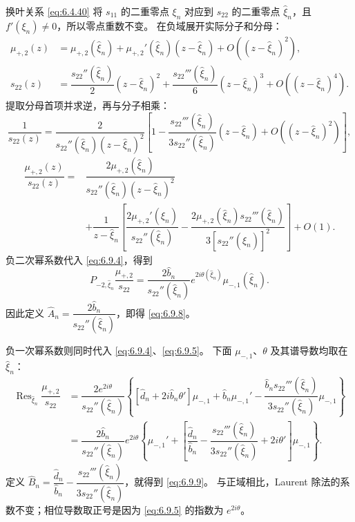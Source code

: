 \documentclass[lang=cn,scheme=chinese,mode=simple,device=normal,color=blue,
math=cm,thmcnt=section,12pt]{elegantbook}
\DeclareMathOperator*{\Res}{Res}
\begin{document}
\begin{callout}
    换叶关系 \eqref{eq:6.4.40} 将 $s_{11}$ 的二重零点 $\xi_n$ 对应到
    $s_{22}$ 的二重零点 $\widehat\xi_n$，且 $f'(\xi_n)\ne0$，所以零点重数不变。
    在负域展开实际分子和分母：
    \[
        \begin{aligned}
            \mu_{+,2}(z) & =\mu_{+,2}(\widehat\xi_n)+\mu_{+,2}'(\widehat\xi_n)(z-\widehat\xi_n)
            +O((z-\widehat\xi_n)^2),                                                            \\
            s_{22}(z)    & =\dfrac{s_{22}''(\widehat\xi_n)}{2}(z-\widehat\xi_n)^2
            +\dfrac{s_{22}'''(\widehat\xi_n)}{6}(z-\widehat\xi_n)^3+O((z-\widehat\xi_n)^4).
        \end{aligned}
    \]
    提取分母首项并求逆，再与分子相乘：
    \[
        \dfrac{1}{s_{22}(z)}=\dfrac{2}{s_{22}''(\widehat\xi_n)(z-\widehat\xi_n)^2}
        \left[1-\dfrac{s_{22}'''(\widehat\xi_n)}{3s_{22}''(\widehat\xi_n)}(z-\widehat\xi_n)
            +O((z-\widehat\xi_n)^2)\right],
    \]
    \[
        \begin{aligned}
            \dfrac{\mu_{+,2}(z)}{s_{22}(z)}
            ={} & \dfrac{2\mu_{+,2}(\widehat\xi_n)}{s_{22}''(\widehat\xi_n)(z-\widehat\xi_n)^2} \\
                & +\dfrac{1}{z-\widehat\xi_n}\left[
                \dfrac{2\mu_{+,2}'(\widehat\xi_n)}{s_{22}''(\widehat\xi_n)}
                -\dfrac{2\mu_{+,2}(\widehat\xi_n)s_{22}'''(\widehat\xi_n)}{3[s_{22}''(\widehat\xi_n)]^2}\right]+O(1).
        \end{aligned}
    \]
    负二次幂系数代入 \eqref{eq:6.9.4}，得到
    \[
        P_{-2,\widehat\xi_n}\dfrac{\mu_{+,2}}{s_{22}}
        =\dfrac{2\widehat b_n}{s_{22}''(\widehat\xi_n)}e^{2i\theta(\widehat\xi_n)}\mu_{-,1}(\widehat\xi_n).
    \]
    因此定义 $\widehat A_n=\dfrac{2\widehat b_n}{s_{22}''(\widehat\xi_n)}$，即得 \eqref{eq:6.9.8}。

    负一次幂系数则同时代入 \eqref{eq:6.9.4}、\eqref{eq:6.9.5}。
    下面 $\mu_{-,1}$、$\theta$ 及其谱导数均取在 $\widehat\xi_n$：
    \[
        \begin{aligned}
            \Res_{\widehat\xi_n}\dfrac{\mu_{+,2}}{s_{22}}
             & =\dfrac{2e^{2i\theta}}{s_{22}''(\widehat\xi_n)}
            \left\{[\widehat d_n+2i\widehat b_n\theta']\mu_{-,1}+\widehat b_n\mu_{-,1}'
            -\dfrac{\widehat b_ns_{22}'''(\widehat\xi_n)}{3s_{22}''(\widehat\xi_n)}\mu_{-,1}\right\} \\
             & =\dfrac{2\widehat b_n}{s_{22}''(\widehat\xi_n)}e^{2i\theta}
            \left\{\mu_{-,1}'+\left[\dfrac{\widehat d_n}{\widehat b_n}
                -\dfrac{s_{22}'''(\widehat\xi_n)}{3s_{22}''(\widehat\xi_n)}+2i\theta'\right]\mu_{-,1}\right\}.
        \end{aligned}
    \]
    定义
    $\widehat B_n=\dfrac{\widehat d_n}{\widehat b_n}
        -\dfrac{s_{22}'''(\widehat\xi_n)}{3s_{22}''(\widehat\xi_n)}$，就得到 \eqref{eq:6.9.9}。
    与正域相比，Laurent 除法的系数不变；相位导数取正号是因为 \eqref{eq:6.9.5} 的指数为 $e^{2i\theta}$。


\end{callout}
\end{document}
